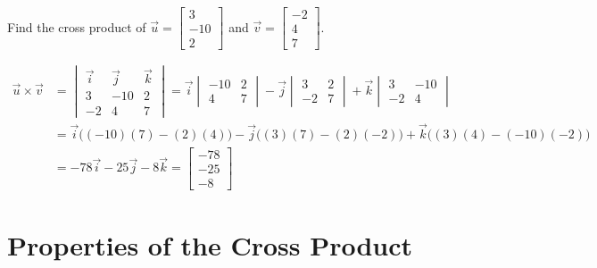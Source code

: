 \documentclass{ximera}
\begin{document}
\begin{example}\label{ex:crossproduct}
Find the cross product of $\vec{u}=\begin{bmatrix}3\\ -10\\ 2\end{bmatrix}$ and $\vec{v}=\begin{bmatrix}-2\\ 4\\ 7\end{bmatrix}$.
\begin{explanation}
\begin{align*}
\vec{u}\times \vec{v}&=
\begin{vmatrix}
\vec{i} & \vec{j} & \vec{k}\\
3 & -10 &2\\
-2 &4 &7
\end{vmatrix} =\vec{i}
\begin{vmatrix}
-10 & 2\\
4 & 7
\end{vmatrix} -\vec{j}
\begin{vmatrix}
3 & 2\\
-2 & 7
\end{vmatrix} +\vec{k}
\begin{vmatrix}
3 & -10\\
-2 & 4
\end{vmatrix}\\
&=\vec{i}\Big((-10)(7)-(2)(4)\Big)-\vec{j}\Big((3)(7)-(2)(-2)\Big)+\vec{k}\Big((3)(4)-(-10)(-2)\Big)\\
&=-78\vec{i}-25\vec{j}-8\vec{k}
=\begin{bmatrix}-78\\ -25\\ -8\end{bmatrix}
\end{align*}
\end{explanation}
\end{example}

\section*{Properties of the Cross Product}

\end{document}
